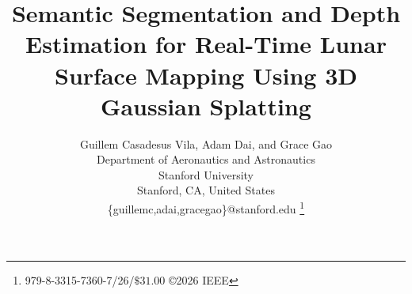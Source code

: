 \documentclass[twocolumn,letterpaper]{IEEEAerospaceCLS}
\begin{document}

\title{Semantic Segmentation and Depth Estimation for Real-Time Lunar Surface Mapping Using 3D Gaussian Splatting}

\author{%
	Guillem Casadesus Vila, Adam Dai, and Grace Gao\\
	Department of Aeronautics and Astronautics\\
	Stanford University\\
	Stanford, CA, United States\\
	\{guillemc,adai,gracegao\}@stanford.edu
	\thanks{\footnotesize 979-8-3315-7360-7/26/$\$31.00$ \copyright2026 IEEE}
}

\maketitle

\thispagestyle{plain}
\pagestyle{plain}


\tableofcontents







\small



\vspace{10em}

\end{document}

